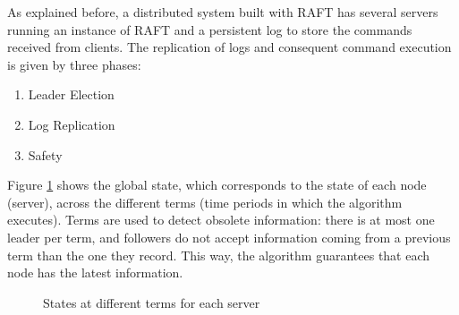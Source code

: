 \documentclass[12pt,a4paper]{article}
\begin{document}
As explained before, a distributed system built with RAFT has several servers running an instance of RAFT and a persistent log to store the commands received from clients. The replication of logs and consequent command execution is given by three phases:
\begin{enumerate}
    \item Leader Election
    \item Log Replication
    \item Safety
\end{enumerate}

Figure \ref{fig:state_empty} shows the global state, which corresponds to the state of each node (server), across the different terms (time periods in which the algorithm executes). Terms are used to detect obsolete information: there is at most one leader per term, and followers do not accept information coming from a previous term than the one they record. This way, the algorithm guarantees that each node has the latest information.

\begin{figure}
    \centering
    \qquad
    \caption{States at different terms for each server}%
    \label{fig:state_empty}%
\end{figure}
 
\end{document}
